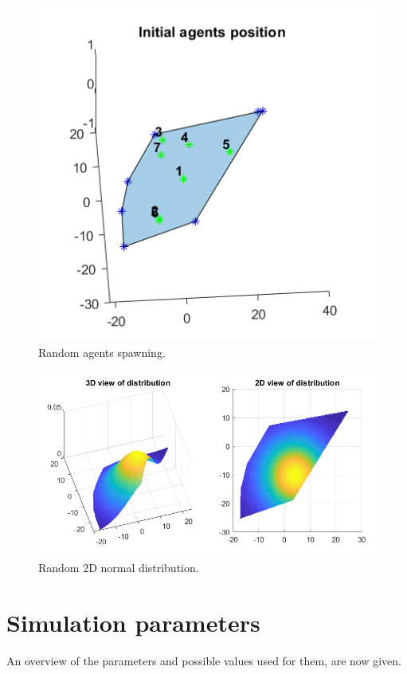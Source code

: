 \documentclass[a4paper,11pt,oneside]{book}
\begin{document}
	\begin{figure}	
		\centering	
		\includegraphics[scale=0.7]{figs/randomAgents.png}
		\caption{Random agents spawning.}\label{fig:randomAgents.png}	
	\end{figure}
	
	\begin{figure}	
		\centering	
		\includegraphics[scale=0.7]{figs/gaussianDistrib.png}
		\caption{Random 2D normal distribution.}\label{fig:gaussianDistrib.png}	
	\end{figure}


	
	\section{Simulation parameters}
	An overview of the parameters and possible values used for them, are now given.
\end{document}
